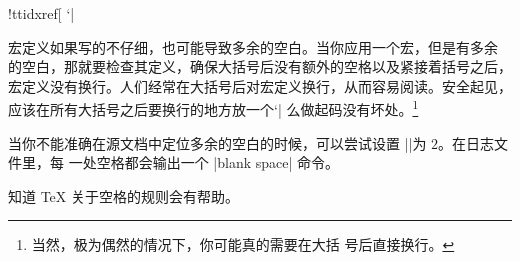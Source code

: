 {\recat!ttidxref[%
`|%


宏定义如果写的不仔细，也可能导致多余的空白。当你应用一个宏，但是有多余
的空白，那就要检查其定义，确保大括号后没有额外的空格以及紧接着括号之后，
宏定义没有换行。人们经常在大括号后对宏定义换行，从而容易阅读。安全起见，
应该在所有大括号之后要换行的地方放一个`|%
么做起码没有坏处。\footnote{当然，极为偶然的情况下，你可能真的需要在大括
  号后直接换行。}


当你不能准确在源文档中定位多余的空白的时候，可以尝试设置
|\tracingcommands|\ctsref{\tracingcommands}为 $2$。在日志文件里，每
一处空格都会输出一个 |{blank space}| 命令。


知道 \TeX{} 关于空格的规则会有帮助。


}
